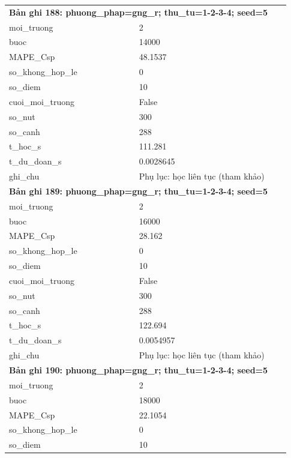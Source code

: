 \begin{longtable}{p{0.43\linewidth}p{0.50\linewidth}}
\midrule
\multicolumn{2}{p{0.95\linewidth}}{\textbf{Bản ghi 188: phuong\_phap=gng\_r; thu\_tu=1-2-3-4; seed=5}} \\
moi\_\allowbreak truong & 2 \\
buoc & 14000 \\
MAPE\_\allowbreak Csp & 48.1537 \\
so\_\allowbreak khong\_\allowbreak hop\_\allowbreak le & 0 \\
so\_\allowbreak diem & 10 \\
cuoi\_\allowbreak moi\_\allowbreak truong & False \\
so\_\allowbreak nut & 300 \\
so\_\allowbreak canh & 288 \\
t\_\allowbreak hoc\_\allowbreak s & 111.281 \\
t\_\allowbreak du\_\allowbreak doan\_\allowbreak s & 0.0028645 \\
ghi\_\allowbreak chu & Phụ lục: học liên tục (tham khảo) \\
\midrule
\multicolumn{2}{p{0.95\linewidth}}{\textbf{Bản ghi 189: phuong\_phap=gng\_r; thu\_tu=1-2-3-4; seed=5}} \\
moi\_\allowbreak truong & 2 \\
buoc & 16000 \\
MAPE\_\allowbreak Csp & 28.162 \\
so\_\allowbreak khong\_\allowbreak hop\_\allowbreak le & 0 \\
so\_\allowbreak diem & 10 \\
cuoi\_\allowbreak moi\_\allowbreak truong & False \\
so\_\allowbreak nut & 300 \\
so\_\allowbreak canh & 288 \\
t\_\allowbreak hoc\_\allowbreak s & 122.694 \\
t\_\allowbreak du\_\allowbreak doan\_\allowbreak s & 0.0054957 \\
ghi\_\allowbreak chu & Phụ lục: học liên tục (tham khảo) \\
\midrule
\multicolumn{2}{p{0.95\linewidth}}{\textbf{Bản ghi 190: phuong\_phap=gng\_r; thu\_tu=1-2-3-4; seed=5}} \\
moi\_\allowbreak truong & 2 \\
buoc & 18000 \\
MAPE\_\allowbreak Csp & 22.1054 \\
so\_\allowbreak khong\_\allowbreak hop\_\allowbreak le & 0 \\
so\_\allowbreak diem & 10 \\

\end{longtable}
